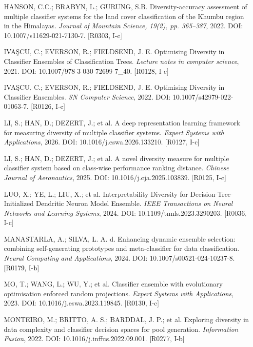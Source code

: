 \begin{description}
\item HANSON, C.C.; BRABYN, L.; GURUNG, S.B. Diversity-accuracy assessment of multiple classifier systems for the land cover classification of the Khumbu region in the Himalayas. \emph{Journal of Mountain Science, 19(2), pp. 365--387}, 2022. DOI: 10.1007/s11629-021-7130-7. [R0303, I-c]

\item IVA\c{S}CU, C.; EVERSON, R.; FIELDSEND, J. E. Optimising Diversity in Classifier Ensembles of Classification Trees. \emph{Lecture notes in computer science}, 2021. DOI: 10.1007/978-3-030-72699-7\_40. [R0128, I-c]

\item IVA\c{S}CU, C.; EVERSON, R.; FIELDSEND, J. E. Optimising Diversity in Classifier Ensembles. \emph{SN Computer Science}, 2022. DOI: 10.1007/s42979-022-01063-7. [R0126, I-c]

\item LI, S.; HAN, D.; DEZERT, J.; et al. A deep representation learning framework for measuring diversity of multiple classifier systems. \emph{Expert Systems with Applications}, 2026. DOI: 10.1016/j.eswa.2026.133210. [R0127, I-c]

\item LI, S.; HAN, D.; DEZERT, J.; et al. A novel diversity measure for multiple classifier system based on class-wise performance ranking distance. \emph{Chinese Journal of Aeronautics}, 2025. DOI: 10.1016/j.cja.2025.103839. [R0125, I-c]

\item LUO, X.; YE, L.; LIU, X.; et al. Interpretability Diversity for Decision-Tree-Initialized Dendritic Neuron Model Ensemble. \emph{IEEE Transactions on Neural Networks and Learning Systems}, 2024. DOI: 10.1109/tnnls.2023.3290203. [R0036, I-c]

\item MANASTARLA, A.; SILVA, L. A. d. Enhancing dynamic ensemble selection: combining self-generating prototypes and meta-classifier for data classification. \emph{Neural Computing and Applications}, 2024. DOI: 10.1007/s00521-024-10237-8. [R0179, I-b]

\item MO, T.; WANG, L.; WU, Y.; et al. Classifier ensemble with evolutionary optimisation enforced random projections. \emph{Expert Systems with Applications}, 2023. DOI: 10.1016/j.eswa.2023.119845. [R0130, I-c]

\item MONTEIRO, M.; BRITTO, A. S.; BARDDAL, J. P.; et al. Exploring diversity in data complexity and classifier decision spaces for pool generation. \emph{Information Fusion}, 2022. DOI: 10.1016/j.inffus.2022.09.001. [R0277, I-b]


\end{description}
